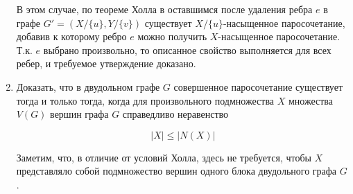 \documentclass[fleqn]{article}
\begin{document}
\begin{enumerate}
	В этом случае, по теореме Холла в оставшимся после удаления ребра $e$ в графе $G' = (X / \{u\}, Y / \{v\})$ существует $X / \{u\}$-насыщенное паросочетание, добавив к которому ребро $e$ можно получить $X$-насыщенное паросочетание. Т.к. $e$ выбрано произвольно, то описанное свойство выполняется для всех ребер, и требуемое утверждение доказано.
	
	\item Доказать, что в двудольном графе $G$ совершенное паросочетание существует тогда и только тогда,
	когда для произвольного подмножества $X$ множества $V(G)$ вершин графа $G$ справедливо неравенство
	
	$$|X| \leqslant |N(X)|$$
	
	Заметим, что, в отличие от условий Холла, здесь не требуется, чтобы $X$ представляло собой
	подмножество вершин одного блока двудольного графа $G$.
	\end{enumerate}
	
	
\end{document}
